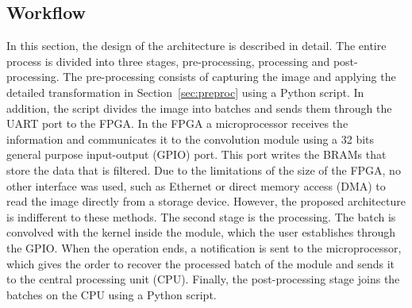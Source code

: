 \documentclass[conference,compsoc]{IEEEtran}
\begin{document}
\subsection{Workflow}
In this section, the design of the architecture is described in detail. The
entire process is divided into three stages, pre-processing, processing and
post-processing. The pre-processing consists of capturing the image and applying
the detailed transformation in Section~\ref{sec:preproc} using a Python script.
In addition, the script divides the image into batches and sends them through
the UART port to the FPGA. In the FPGA a microprocessor receives the information
and communicates it to the convolution module using a 32 bits general purpose
input-output (GPIO) port. This port writes the BRAMs that store the data that
is filtered. Due to the limitations of the size of the FPGA, no other
interface was used, such as Ethernet or direct memory access (DMA) to read the
image directly from a storage device. However, the proposed architecture is
indifferent to these methods. The second stage is the processing. The batch is
convolved with the kernel inside the module, which the user establishes through
the GPIO. When the operation ends, a notification is sent to the microprocessor,
which gives the order to recover the processed batch of the module and sends it
to the central processing unit (CPU). Finally, the post-processing stage joins
the batches on the CPU using a Python script.


\end{document}
